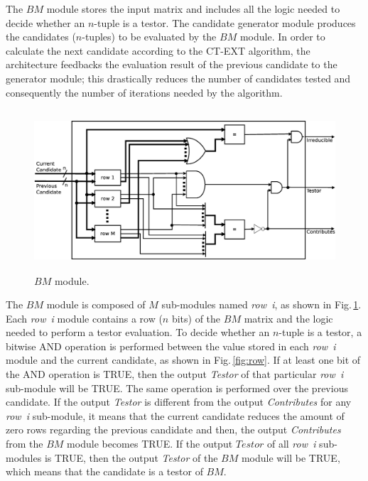 \documentclass[authoryear,preprint,review,12pt]{elsarticle}
\begin{document}
The $BM$ module stores the input matrix and
includes all the logic needed to decide whether an $n$-tuple is a testor. The candidate
generator module produces the candidates ($n$-tuples) to be
evaluated by the $BM$ module. In order to calculate the next candidate
according to the CT-EXT algorithm, the architecture feedbacks the
evaluation result of the previous candidate to the generator module;
this drastically reduces the number of candidates tested and
consequently the number of iterations needed by the algorithm. 


\begin{figure}[htb]
    \begin{center}
        \includegraphics[height=6cm]{BM_module.eps}
    \end{center}
\caption{$BM$ module.}
\label{fig:4}
\end{figure}

The $BM$ module is composed of $M$ sub-modules named \textit{row~i}, as shown
in Fig.\,\ref{fig:4}. Each \textit{row~i} module contains a row ($n$ bits)
of the $BM$ matrix and the logic needed to perform a testor evaluation. To decide
whether an $n$-tuple is a testor, a bitwise AND operation is performed
between the value stored in each \textit{row~i} module and the current
candidate, as shown in Fig.\,\ref{fig:row}. If at least one bit of the AND operation is TRUE,
then the output \textit{Testor} of that particular \textit{row~i} sub-module
will be TRUE. The same operation is performed over the previous candidate.
If the output \textit{Testor} is different from
the output \textit{Contributes} for any \textit{row~i} sub-module,
it means that the current candidate reduces the amount of zero rows regarding the previous candidate and
then, the output \textit{Contributes} from the $BM$ module becomes TRUE.
If the output $Testor$ of all  \textit{row~i} sub-modules is
TRUE, then the output \textit{Testor} of the $BM$ module will be TRUE,
which means that the candidate is a testor of $BM$.
\end{document}
